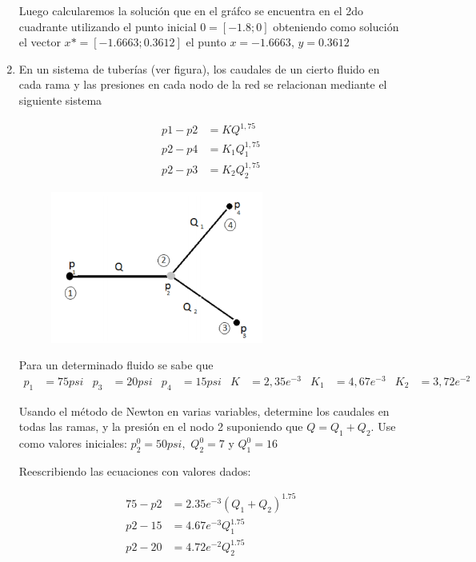 \documentclass{udparticle}
\begin{document}
\begin{enumerate}
        Luego calcularemos la solución que en el gráfco se encuentra en el 2do cuadrante utilizando el punto inicial $0=[-1.8;0]$
        obteniendo como solución el vector $x*=[-1.6663;0.3612]$ el punto  $x=-1.6663$, $y=0.3612$

    
        \newpage
        
        \item En un sistema de tuberías (ver figura), los caudales de un cierto fluido en cada rama y las presiones en cada nodo de la red se relacionan mediante el siguiente sistema
        
        \begin{align*} 
            p1 - p2 &= KQ^{1,75} \\ 
            p2 - p4 &= K_1 Q_1^{1,75}\\
            p2 - p3 &= K_2 Q_2^{1,75}
        \end{align*}
        
    \begin{figure}[H]
    \centering
    \includegraphics[width=7cm]{imagenEjec}
    \end{figure}        
    
    Para un determinado fluido se sabe que
    \begin{align*}
    p_1&=75psi & p_3&=20psi &  p_4&=15psi & K&=2,35e^{-3} & K_1&=4,67e^{-3} & K_2&=3,72e^{-2}
    \end{align*}
    
    Usando el método de Newton en varias variables, determine los caudales en todas las ramas, y la presión en el nodo 2 suponiendo que $Q = Q_1 + Q_2 $. Use como valores iniciales: $ p_2^0= 50 psi,$  $Q_2^0=7$ y  $Q_1^0=16$
    
    
    Reescribiendo las ecuaciones con valores dados:
    
    \begin{align*} 
        75 - p2 &=  2.35e^{-3}(Q_1+Q_2)^{1.75} \\ 
        p2 - 15 &= 4.67e^{-3}Q_1^{1.75} \\
        p2 - 20 &= 4.72e^{-2}Q_2^{1.75}
    \end{align*}
    

\end{enumerate}
\end{document}
